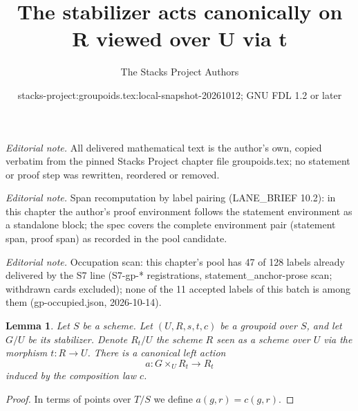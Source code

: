 \documentclass[10pt,a4paper]{amsart}
\title{The stabilizer acts canonically on R viewed over U via t}
\author{The Stacks Project Authors}
\date{stacks-project:groupoids.tex:local-snapshot-20261012; GNU FDL 1.2 or later}
\theoremstyle{plain}
\newtheorem{lemma}[subsection]{Lemma}
\theoremstyle{definition}
\theoremstyle{remark}
\numberwithin{equation}{subsection}
\begin{document}
\maketitle
\noindent\textit{Editorial note.} All delivered mathematical text is the author's own, copied verbatim from the pinned Stacks Project chapter file groupoids.tex; no statement or proof step was rewritten, reordered or removed.\par\medskip
\noindent\textit{Editorial note.} Span recomputation by label pairing (LANE\_BRIEF 10.2): in this chapter the author's proof environment follows the statement environment as a standalone block; the spec covers the complete environment pair (statement span, proof span) as recorded in the pool candidate.\par\medskip
\noindent\textit{Editorial note.} Occupation scan: this chapter's pool has 47 of 128 labels already delivered by the S7 line (S7-gp-* registrations, statement\_anchor-prose scan; withdrawn cards excluded); none of the 11 accepted labels of this batch is among them (gp-occupied.json, 2026-10-14).\par\medskip
\begin{lemma}
\label{lemma-groupoid-action-stabilizer}
Let $S$ be a scheme.
Let $(U, R, s, t, c)$ be a groupoid over $S$, and let $G/U$ be its stabilizer.
Denote $R_t/U$ the scheme $R$ seen as a scheme over $U$ via the
morphism $t : R \to U$.
There is a canonical left action
$$
a : G \times_U R_t \longrightarrow R_t
$$
induced by the composition law $c$.
\end{lemma}

\begin{proof}
In terms of points over $T/S$ we define $a(g, r) = c(g, r)$.
\end{proof}
\end{document}
